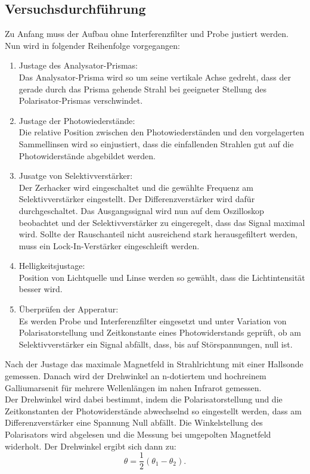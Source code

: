 \subsection{Versuchsdurchführung}
Zu Anfang muss der Aufbau ohne Interferenzfilter und Probe justiert werden.
Nun wird in folgender Reihenfolge vorgegangen:
\begin{enumerate}
  \item Justage des Analysator-Prismas:\\
  Das Analysator-Prisma wird so um seine vertikale Achse gedreht, dass
  der gerade durch das Prisma gehende Strahl bei geeigneter Stellung des
  Polarisator-Prismas verschwindet.
  \item Justage der Photowiederstände:\\
  Die relative Position zwischen den Photowiederständen und den vorgelagerten
  Sammellinsen wird so einjustiert, dass die einfallenden Strahlen gut auf
  die Photowiderstände abgebildet werden.
  \item Jusatge von Selektivverstärker:\\
  Der Zerhacker wird eingeschaltet und die gewählte Frequenz am Selektivverstärker
  eingestellt. Der Differenzverstärker wird dafür durchgeschaltet. Das Ausgangssignal wird
  nun auf dem Oszilloskop beobachtet und  der Selektivverstärker zu eingeregelt,
  dass das Signal maximal wird. Sollte der Rauschanteil nicht ausreichend stark
  herausgefiltert werden, muss ein Lock-In-Verstärker eingeschleift werden.
  \item Helligkeitsjustage:\\
  Position von Lichtquelle und Linse werden so gewählt, dass die Lichtintensität
  besser wird.
  \item Überprüfen der Apperatur:\\
  Es werden Probe und Interferenzfilter eingesetzt und unter Variation von
  Polarisatorstellung und Zeitkonstante eines Photowiderstands geprüft,
  ob am Selektivverstärker ein Signal abfällt, dass, bis auf Störspannungen, null ist.
\end{enumerate}
Nach der Justage das maximale Magnetfeld in Strahlrichtung mit einer Hallsonde gemessen. Danach wird
der Drehwinkel an n-dotiertem und hochreinem Galliumarsenit für mehrere Wellenlängen
im nahen Infrarot gemessen.\\
Der Drehwinkel wird dabei bestimmt, indem die Polarisatorstellung und die Zeitkonstanten der
Photowiderstände abwechselnd so eingestellt werden, dass am Differenzverstärker eine Spannung
Null abfällt. Die Winkelstellung des Polarisators wird abgelesen und die Messung
bei umgepolten Magnetfeld widerholt. Der Drehwinkel ergibt sich dann zu:
\begin{equation}
  \theta = \frac{1}{2} \left(\theta_1 - \theta_2 \right).
  \label{runederaffe}
\end{equation}
